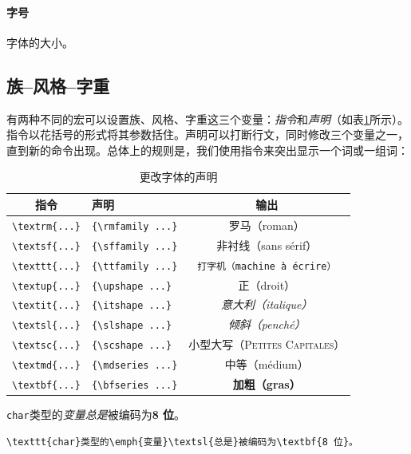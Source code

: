\paragraph*{字号}字{\large 体}{\Large 的}{\LARGE 大}{\small 小}。

\subsection{族--风格--字重}

有两种不同的宏可以设置族、风格、字重这三个变量：\textit{指令}和\textit{声明}（如表\ref{tab:2.1}所示）。指令以花括号的形式将其参数括住。声明可以打断行文，同时修改三个变量之一，直到新的命令出现。总体上的规则是，我们使用指令来突出显示一个词或一组词：

\begin{table}
    \centering
    \begin{tabular}{|c|l|c|}
\hline
指令 & 声明 & 输出\\
\hline
\verb+\textrm{...}+ & \verb+{\rmfamily ...}+ & 罗马（roman） \\
\verb+\textsf{...}+ & \verb+{\sffamily ...}+ & \textsf{非衬线（sans sérif）} \\
\verb+\texttt{...}+ & \verb+{\ttfamily ...}+ & \texttt{打字机（machine à écrire）} \\
\hline
\verb+\textup{...}+ & \verb+{\upshape ...}+ & 正（droit） \\
\verb+\textit{...}+ & \verb+{\itshape ...}+ & \textit{意大利（italique）} \\
\verb+\textsl{...}+ & \verb+{\slshape ...}+ & \textsl{倾斜（penché）} \\
\verb+\textsc{...}+ & \verb+{\scshape ...}+ & \textsc{小型大写（Petites Capitales）} \\
\hline
\verb+\textmd{...}+ & \verb+{\mdseries ...}+ & 中等（médium） \\
\verb+\textbf{...}+ & \verb+{\bfseries ...}+ & \textbf{加粗（gras）} \\
\hline
    \end{tabular}
    \caption{更改字体的声明}
    \label{tab:2.1}
\end{table}

\begin{codelist}[2.1]{
    \texttt{char}类型的\emph{变量}\textsl{总是}被编码为\textbf{8 位}。
}
\begin{verbatim}
\texttt{char}类型的\emph{变量}\textsl{总是}被编码为\textbf{8 位}。
\end{verbatim}
\end{codelist}


